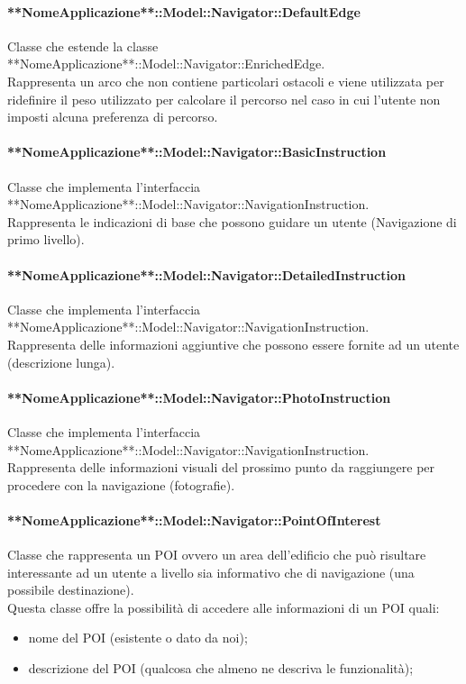 \documentclass[../SpecificaTecnica.tex]{subfiles}
\begin{document}
				\paragraph{**NomeApplicazione**::Model::Navigator::DefaultEdge}
					Classe che estende la classe **NomeApplicazione**::Model::Navigator::EnrichedEdge. \\
					Rappresenta un arco che non contiene particolari ostacoli e viene utilizzata per ridefinire il peso utilizzato per calcolare il percorso nel caso in cui l'utente non imposti alcuna preferenza di percorso.
				\paragraph{**NomeApplicazione**::Model::Navigator::BasicInstruction}
					Classe che implementa l'interfaccia **NomeApplicazione**::Model::Navigator::NavigationInstruction. \\
					Rappresenta le indicazioni di base che possono guidare un utente (Navigazione di primo livello).
				\paragraph{**NomeApplicazione**::Model::Navigator::DetailedInstruction}
					Classe che implementa l'interfaccia **NomeApplicazione**::Model::Navigator::NavigationInstruction. \\
					Rappresenta delle informazioni aggiuntive che possono essere fornite ad un utente (descrizione lunga).
				\paragraph{**NomeApplicazione**::Model::Navigator::PhotoInstruction}
					Classe che implementa l'interfaccia **NomeApplicazione**::Model::Navigator::NavigationInstruction. \\
					Rappresenta delle informazioni visuali del prossimo punto da raggiungere per procedere con la navigazione (fotografie).
				\paragraph{**NomeApplicazione**::Model::Navigator::PointOfInterest}
					Classe che rappresenta un POI ovvero un area dell'edificio che può risultare interessante ad un utente a livello sia informativo che di navigazione (una possibile destinazione). \\
					Questa classe offre la possibilità di accedere alle informazioni di un POI quali:
					\begin{itemize}
						\item nome del POI (esistente o dato da noi);
						\item descrizione del POI (qualcosa che almeno ne descriva le funzionalità);
					\end{itemize}
\end{document}
